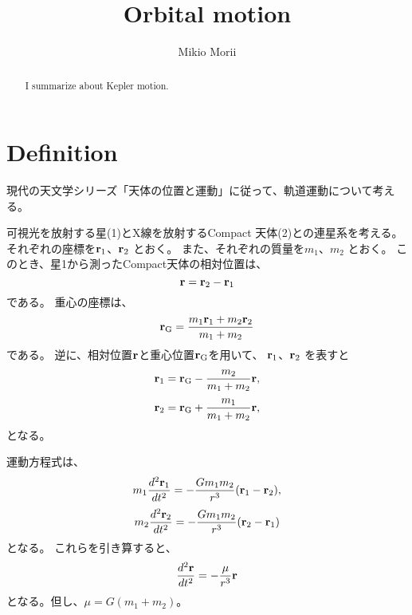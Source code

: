 


\textwidth=17.8cm
\oddsidemargin=-1.1cm
\evensidemargin=-1.1cm
%
\def\Ltsim{\mathrel{\vbox to 0pt{\hbox{$\sim$}}\llap{$<$}}}
\def\Gtsim{\mathrel{\vbox to 0pt{\hbox{$\sim$}}\llap{$>$}}}

\title{Orbital motion}
\author{Mikio Morii}
 

\maketitle
\begin{abstract}
I summarize about Kepler motion.
\end{abstract}

\section{Definition}

現代の天文学シリーズ「天体の位置と運動」に従って、軌道運動について考える。

可視光を放射する星(1)とX線を放射するCompact 天体(2)との連星系を考える。
それぞれの座標を${\bf r}_1$、${\bf r}_2$ とおく。
また、それぞれの質量を$m_1$、$m_2$ とおく。
このとき、星1から測ったCompact天体の相対位置は、
\begin{equation}
{\bf r} = {\bf r}_2 - {\bf r}_1
\end{equation}
である。
重心の座標は、
\begin{equation}
{\bf r}_{\rm G} = \frac{m_1 {\bf r}_1 + m_2 {\bf r}_2}{m_1 + m_2}
\end{equation}
である。
逆に、相対位置${\bf r}$と重心位置${\bf r}_{\rm G}$を用いて、
${\bf r}_1$、${\bf r}_2$ を表すと
\begin{equation}
  {\bf r}_1 = {\bf r}_{\rm G} - \frac{m_2}{m_1 + m_2} {\bf r},
\end{equation}
\begin{equation}
  {\bf r}_2 = {\bf r}_{\rm G} + \frac{m_1}{m_1 + m_2} {\bf r},
\end{equation}
となる。

運動方程式は、
\begin{equation}
m_1 \frac{d^2 {\bf r}_1}{d t^2} = - \frac{G m_1 m_2}{r^3}
({\bf r}_1 - {\bf r}_2),
\end{equation}
\begin{equation}
m_2 \frac{d^2 {\bf r}_2}{d t^2} = - \frac{G m_1 m_2}{r^3}
({\bf r}_2 - {\bf r}_1)
\end{equation}
となる。
これらを引き算すると、
\begin{equation}
\frac{d^2 {\bf r}}{d t^2} = - \frac{\mu}{r^3} {\bf r}
\end{equation}
となる。但し、$\mu = G (m_1 + m_2)$。

